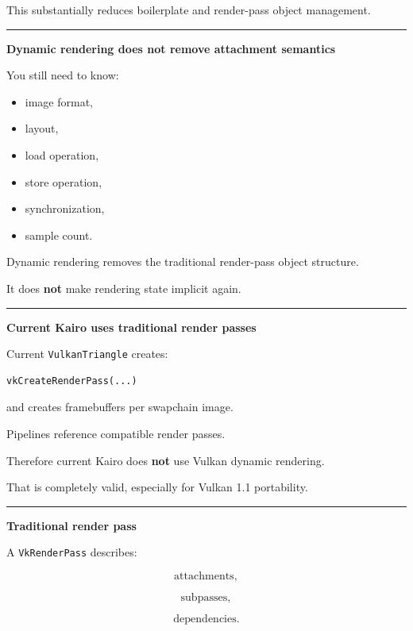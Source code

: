 This substantially reduces boilerplate and render-pass object management.

\begin{center}\rule{0.5\linewidth}{0.5pt}\end{center}

\textbf{Dynamic rendering does not remove attachment semantics}

You still need to know:

\begin{itemize}
\tightlist
\item
  image format,
\item
  layout,
\item
  load operation,
\item
  store operation,
\item
  synchronization,
\item
  sample count.
\end{itemize}

Dynamic rendering removes the traditional render-pass object structure.

It does \textbf{not} make rendering state implicit again.

\begin{center}\rule{0.5\linewidth}{0.5pt}\end{center}

\textbf{Current Kairo uses traditional render passes}

Current \texttt{VulkanTriangle} creates:

\begin{verbatim}
vkCreateRenderPass(...)
\end{verbatim}

and creates framebuffers per swapchain image.

Pipelines reference compatible render passes.

Therefore current Kairo does \textbf{not} use Vulkan dynamic rendering.

That is completely valid, especially for Vulkan 1.1 portability.

\begin{center}\rule{0.5\linewidth}{0.5pt}\end{center}

\textbf{Traditional render pass}

A \texttt{VkRenderPass} describes:

\[
\text{attachments},
\]

\[
\text{subpasses},
\]

\[
\text{dependencies}.
\]

